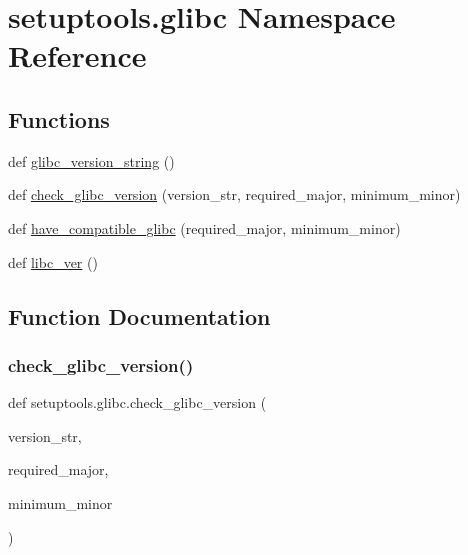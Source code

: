 \hypertarget{namespacesetuptools_1_1glibc}{}\section{setuptools.\+glibc Namespace Reference}
\label{namespacesetuptools_1_1glibc}
\subsection*{Functions}
\begin{DoxyCompactItemize}
\item 
def \hyperlink{namespacesetuptools_1_1glibc_a34f30251dcf219f515c161c578dd4b2a}{glibc\+\_\+version\+\_\+string} ()
\item 
def \hyperlink{namespacesetuptools_1_1glibc_a55fcd866ffb121c5eee2eb6e75eef61d}{check\+\_\+glibc\+\_\+version} (version\+\_\+str, required\+\_\+major, minimum\+\_\+minor)
\item 
def \hyperlink{namespacesetuptools_1_1glibc_a9f9d4fc56791adef1e1f1f0a5ec2caff}{have\+\_\+compatible\+\_\+glibc} (required\+\_\+major, minimum\+\_\+minor)
\item 
def \hyperlink{namespacesetuptools_1_1glibc_ae7bfd7d2e1286b0b63956da6501f1c96}{libc\+\_\+ver} ()
\end{DoxyCompactItemize}


\subsection{Function Documentation}
\mbox{\label{namespacesetuptools_1_1glibc_a55fcd866ffb121c5eee2eb6e75eef61d}} 
\subsubsection{\texorpdfstring{check\+\_\+glibc\+\_\+version()}{check\_glibc\_version()}}
{\footnotesize\ttfamily def setuptools.\+glibc.\+check\+\_\+glibc\+\_\+version (\begin{DoxyParamCaption}\item[{}]{version\+\_\+str,  }\item[{}]{required\+\_\+major,  }\item[{}]{minimum\+\_\+minor }\end{DoxyParamCaption})}

